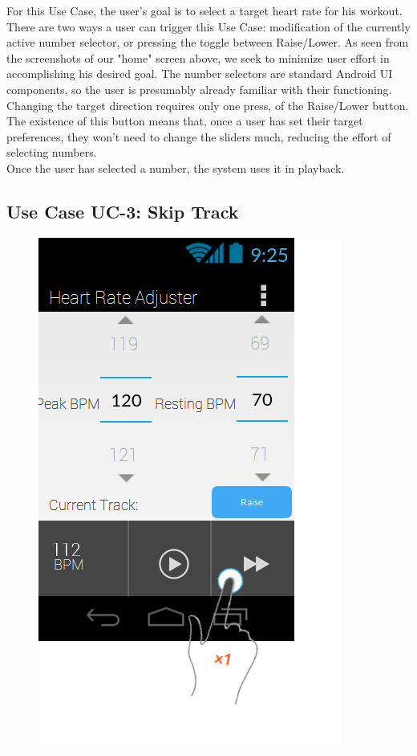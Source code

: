 \documentclass[letterpaper,english, 12pt]{scrreprt}
\begin{document}
For this Use Case, the user's goal is to select a target heart rate for his workout.
There are two ways a user can trigger this Use Case: modification of the currently active number selector, or pressing the toggle between Raise/Lower.
As seen from the screenshots of our "home" screen above, we seek to minimize user effort in accomplishing his desired goal.
The number selectors are standard Android UI components, so the user is presumably already familiar with their functioning.
Changing the target direction requires only one press, of the Raise/Lower button.
The existence of this button means that, once a user has set their target preferences, they won't need to change the sliders much, reducing the effort of selecting numbers.\\

Once the user has selected a number, the system uses it in playback.

\subsection{Use Case UC-3: Skip Track}

\begin{figure}[H]
	\centering
	\includegraphics{img/Prelim_Design/PrelimDesign_2.png}\\
\end{figure}
\end{document}
